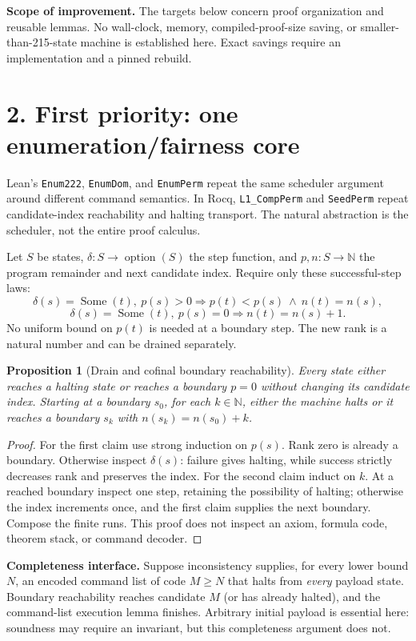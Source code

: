 \documentclass[10pt]{article}
\newtheorem{proposition}{Proposition}
\newcommand{\code}[1]{\texttt{#1}}
\begin{document}
\textbf{Scope of improvement.} The targets below concern proof organization and reusable lemmas. No wall-clock, memory, compiled-proof-size saving, or smaller-than-215-state machine is established here. Exact savings require an implementation and a pinned rebuild.

\section*{2. First priority: one enumeration/fairness core}
Lean's \code{Enum222}, \code{EnumDom}, and \code{EnumPerm} repeat the same scheduler argument around different command semantics. In Rocq, \code{L1\_CompPerm} and \code{SeedPerm} repeat candidate-index reachability and halting transport. The natural abstraction is the scheduler, not the entire proof calculus.

Let $S$ be states, $\delta:S\to\operatorname{option}(S)$ the step function,
and $p,n:S\to\mathbb N$ the program remainder and next candidate index.
Require only these successful-step laws:
\[
\delta(s)=\operatorname{Some}(t),\ p(s)>0
 \Longrightarrow p(t)<p(s)\ \land\ n(t)=n(s),
\]
\[
\delta(s)=\operatorname{Some}(t),\ p(s)=0
 \Longrightarrow n(t)=n(s)+1.
\]
No uniform bound on $p(t)$ is needed at a boundary step. The new rank is a natural number and can be drained separately.
\newpage
\begin{proposition}[Drain and cofinal boundary reachability]
Every state either reaches a halting state or reaches a boundary $p=0$ without changing its candidate index. Starting at a boundary $s_0$, for each $k\in\mathbb N$, either the machine halts or it reaches a boundary $s_k$ with $n(s_k)=n(s_0)+k$.
\end{proposition}
\begin{proof}
For the first claim use strong induction on $p(s)$. Rank zero is already a boundary. Otherwise inspect $\delta(s)$: failure gives halting, while success strictly decreases rank and preserves the index. For the second claim induct on $k$. At a reached boundary inspect one step, retaining the possibility of halting; otherwise the index increments once, and the first claim supplies the next boundary. Compose the finite runs. This proof does not inspect an axiom, formula code, theorem stack, or command decoder.
\end{proof}

\textbf{Completeness interface.} Suppose inconsistency supplies, for every lower bound $N$, an encoded command list of code $M\geq N$ that halts from \emph{every} payload state. Boundary reachability reaches candidate $M$ (or has already halted), and the command-list execution lemma finishes. Arbitrary initial payload is essential here: soundness may require an invariant, but this completeness argument does not.
\end{document}
